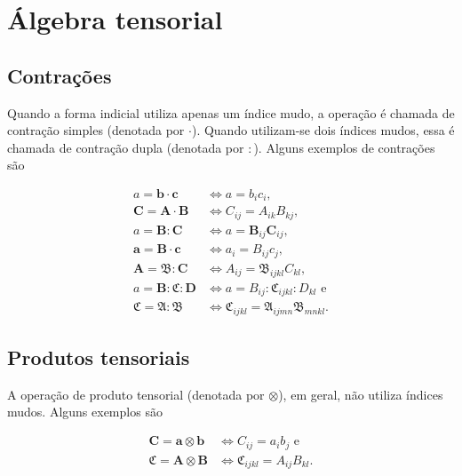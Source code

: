 \documentclass[_ArquivoPrincipal.tex]{subfiles}
\begin{document}
\chapter{Álgebra tensorial}\label{ch:algebra}

\section{Contrações}

Quando a forma indicial utiliza apenas um índice mudo, a operação é chamada de {contração simples} (denotada por $\cdot$). Quando utilizam-se dois índices mudos, essa é chamada de {contração dupla} (denotada por $:$). Alguns exemplos de contrações são

\begin{align}
a = \mathbf{b}\cdot\mathbf{c} &\iff 
a=b_{i}c_i  ,\\
\mathbf{C}=\mathbf{A}\cdot\mathbf{B} &\iff 
{C}_{ij}={A}_{ik}{B}_{kj} , \label{eq:cont2x2} \\
a=\mathbf{B}:\mathbf{C} &\iff 
a=\mathbf{B}_{ij}\mathbf{C}_{ij} , \\
\mathbf{a}=\mathbf{B}\cdot\mathbf{c} &\iff 
a_i=B_{ij}c_j ,\\
\mathbf{A} = \boldsymbol{\mathfrak{B}}:\mathbf{C} &\iff 
A_{ij}=\mathfrak{B}_{ijkl}C_{kl} , \\
a = \mathbf{B}:\boldsymbol{\mathfrak{C}}:\mathbf{D} &\iff  a = B_{ij}:{\mathfrak{C}}_{ijkl}:{D}_{kl} \text{ e}\\
\mathfrak{C}=\mathfrak{A}:\mathfrak{B} &\iff  \mathfrak{C}_{ijkl}=\mathfrak{A}_{ijmn}\mathfrak{B}_{mnkl} .\label{eq:cont4x4} %
\end{align}

\section{Produtos tensoriais}

A operação de produto tensorial (denotada por $\otimes$), em geral, não utiliza índices mudos. Alguns exemplos são

\begin{align}
\mathbf{C}=\mathbf{a}\otimes\mathbf{b} &\iff {C}_{ij}={a}_{i}{b}_{j} \text{  e} \\
\boldsymbol{\mathfrak{C}}=\mathbf{A}\otimes \mathbf{B} &\iff \mathfrak{C}_{ijkl}={A}_{ij}{B}_{kl} \text{.}
\end{align}
\end{document}
